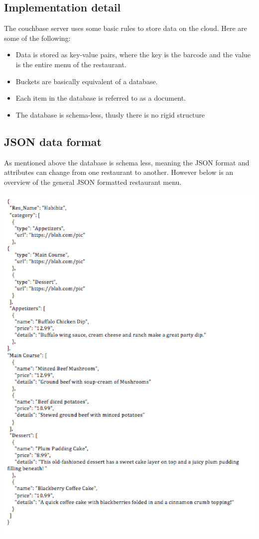 \documentclass[12pt, titlepage]{article}
\begin{document}
\subsection{Implementation detail}
The couchbase server uses some basic rules to store data on the cloud. Here are some of the following:
\begin{itemize}
  \item Data is stored as key-value pairs, where the key is the barcode and the value is the entire menu of the restaurant.
  \item Buckets are basically equivalent of a database.
  \item Each item in the database is referred to as a document.
  \item The database is schema-less, thusly there is no rigid structure
\end{itemize}

\subsection{JSON data format}
As mentioned above the database is schema less, meaning the JSON format and attributes can change from one restaurant to another. However below is an overview of the general JSON formatted restaurant menu.

\includegraphics[width=150mm,scale=0.5]{JSONdata.png}
\end{document}
